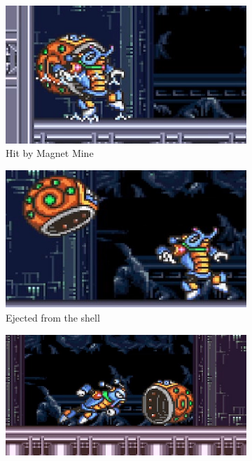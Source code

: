 \begin{figure}[htp]
	\ContinuedFloat
	\centering
	\begin{subfigure}{0.45\linewidth}
		\centering
		\includegraphics[width=\linewidth]{figures/X2/Crystal_snail/Crystal_weakness.png}
		\caption{Hit by Magnet Mine}
	\end{subfigure}
	\begin{subfigure}{0.45\linewidth}
		\centering
		\includegraphics[width=\linewidth]{figures/X2/Crystal_snail/Crystal_weakness_2.png}
		\caption{Ejected from the shell}
	\end{subfigure}
	\begin{subfigure}{0.45\linewidth}
		\centering
		\includegraphics[width=\linewidth]{figures/X2/Crystal_snail/Crystal_no_shell.png}

\end{subfigure}
\end{figure}
